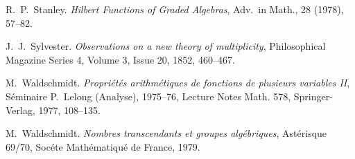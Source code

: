 \documentclass[11pt,twoside]{amsart}
\numberwithin{equation}{section}
\theoremstyle{definition}
\begin{document}
\begin{thebibliography}{B. et al}
 R.\ P.\ Stanley.
\emph{Hilbert Functions of Graded Algebras},
Adv.\ in Math., 28 (1978), 57--82.

 J.\ J.\ Sylvester.
\emph{Observations on a new theory of multiplicity},
Philosophical Magazine Series 4, Volume 3, Issue 20, 1852, 460--467.

 M.\ Waldschmidt. 
\emph{Propri\'et\'es arithm\'etiques de fonctions de plusieurs variables II}, 
S\'eminaire P.\ Lelong (Analyse), 1975--76, Lecture Notes Math. 578, 
Springer-Verlag, 1977, 108--135.

 M.\ Waldschmidt. 
\emph{Nombres transcendants et groupes alg\'ebriques}, 
Ast\'erisque 69/70, Soc\'ete Math\'ematiqu\'e de France, 1979.

\end{thebibliography}
\end{document}
